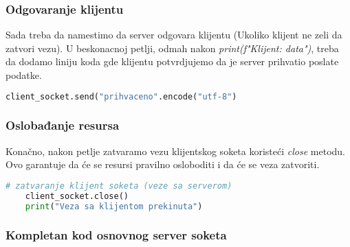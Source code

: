 \subsubsection{Odgovaranje klijentu}

Sada treba da namestimo da server odgovara klijentu (Ukoliko klijent ne zeli da zatvori vezu). U beskonacnoj petlji, odmah nakon \emph{print(f"Klijent: {data}")}, treba da dodamo liniju koda gde klijentu potvrdjujemo da je server prihvatio poslate podatke.

\vspace{0.5cm}

\begin{lstlisting}[language = Python]
    client_socket.send("prihvaceno".encode("utf-8")
\end{lstlisting}

\subsubsection{Oslobađanje resursa}

Konačno, nakon petlje zatvaramo vezu klijentskog soketa koristeći \emph{close} metodu. Ovo garantuje da će se resursi pravilno osloboditi i da će se veza zatvoriti.

\vspace{0.5cm}

\begin{lstlisting}[language = Python]
    # zatvaranje klijent soketa (veze sa serverom)
    client_socket.close()
    print("Veza sa klijentom prekinuta")
\end{lstlisting}

\newpage

\subsubsection{Kompletan kod osnovnog server soketa}

\vspace{0.5cm}

